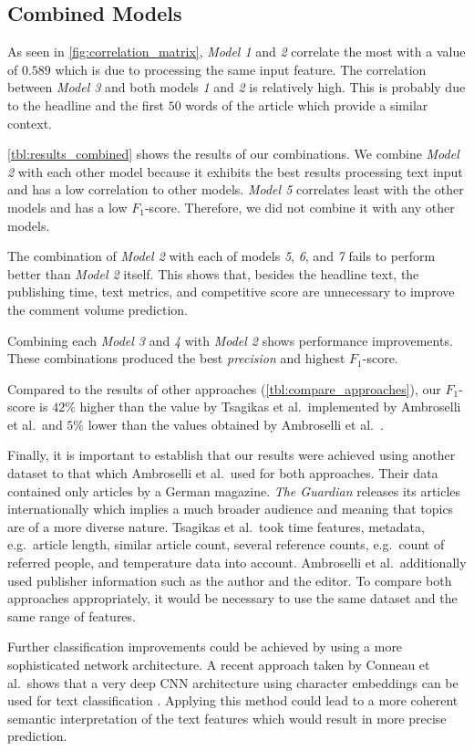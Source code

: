 \subsection{Combined Models}
As seen in \autoref{fig:correlation_matrix}, \textit{Model 1} and \textit{2} correlate the most with a value of $0.589$ which is due to processing the same input feature.
The correlation between \textit{Model 3} and both models \textit{1} and \textit{2} is relatively high. 
This is probably due to the headline and the first $50$ words of the article which provide a similar context.

\autoref{tbl:results_combined} shows the results of our combinations. We combine \textit{Model 2} with each other model because it exhibits the best results processing text input and has a low correlation to other models.
\textit{Model 5} correlates least with the other models and has a low $F_1$-score. Therefore, we did not combine it with any other models.



The combination of \textit{Model 2} with each of models \textit{5}, \textit{6}, and \textit{7} fails to perform better than \textit{Model 2} itself. 
This shows that, besides the headline text, the publishing time, text metrics, and competitive score are unnecessary to improve the comment volume prediction.

Combining each \textit{Model 3} and \textit{4} with \textit{Model 2} shows performance improvements. 
These combinations produced the best \textit{precision} and highest $F_1$-score.

Compared to the results of other approaches (\autoref{tbl:compare_approaches}), our $F_1$-score is $42\%$ higher than the value by Tsagikas et al.\ implemented by Ambroselli et al.\ and $5\%$ lower than the values obtained by Ambroselli et al.\ \cite{ambroselli2018prediction}.



Finally, it is important to establish that our results were achieved using another dataset to that which Ambroselli et al.\ used for both approaches.
Their data contained only articles by a German magazine. 
\textit{The Guardian} releases its articles internationally which implies a much broader audience and meaning that topics are of a more diverse nature.
Tsagikas et al.\ took time features, metadata, e.g.\ article length, similar article count, several reference counts, e.g.\ count of referred people, and temperature data into account.
Ambroselli et al.\ additionally used publisher information such as the author and the editor.
To compare both approaches appropriately, it would be necessary to use the same dataset and the same range of features.

Further classification improvements could be achieved by using a more sophisticated network architecture. 
A recent approach taken by Conneau et al.\ shows that a very deep CNN architecture using character embeddings can be used for text classification \cite{conneau2016very}. 
Applying this method could lead to a more coherent semantic interpretation of the text features which would result in more precise prediction.